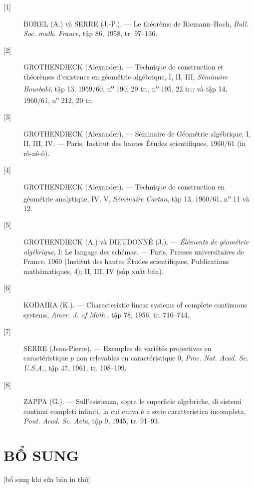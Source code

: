 \documentclass[11pt,twoside,openany]{book}
\numberwithin{equation}{section}
\begin{document}
\begin{description}
\item[{[1]}] BOREL (A.) và SERRE (J.-P.). --- Le théorème de Riemann--Roch,
\emph{Bull. Soc. math. France}, tập 86, 1958, tr. 97--136.

\item[{[2]}] GROTHENDIECK (Alexander). --- Technique de construction et
théorèmes d'existence en géométrie algébrique, I, II, III, \emph{Séminaire
Bourbaki}, tập 13, 1959/60, n\textsuperscript{o} 190, 29 tr.,
n\textsuperscript{o} 195, 22 tr.; và tập 14, 1960/61,
n\textsuperscript{o} 212, 20 tr.

\item[{[3]}] GROTHENDIECK (Alexander). --- Séminaire de Géométrie algébrique,
I, II, III, IV. --- Paris, Institut des hautes Études scientifiques, 1960/61
(in rô-nê-ô).

\item[{[4]}] GROTHENDIECK (Alexander). --- Technique de construction en
géométrie analytique, IV, V, \emph{Séminaire Cartan}, tập 13, 1960/61,
n\textsuperscript{o} 11 và 12.

\item[{[5]}] GROTHENDIECK (A.) và DIEUDONNÉ (J.). --- \emph{Éléments de
géométrie algébrique}, I: Le langage des schémas. --- Paris, Presses
universitaires de France, 1960 (Institut des hautes Études scientifiques,
Publications mathématiques, 4); II, III, IV (sắp xuất bản).

\item[{[6]}] KODAIRA (K.). --- Characteristic linear systems of complete
continuous systems, \emph{Amer. J. of Math.}, tập 78, 1956, tr. 716--744.

\item[{[7]}] SERRE (Jean-Pierre). --- Exemples de variétés projectives en
caractéristique $p$ non relevables en caractéristique 0, \emph{Proc. Nat. Acad.
Sc. U.S.A.}, tập 47, 1961, tr. 108--109.

\item[{[8]}] ZAPPA (G.). --- Sull'esistenza, sopra le superficie algebriche, di
sistemi continui completi infiniti, la cui curva è a serie caratteristica
incompleta, \emph{Pont. Acad. Sc. Acta}, tập 9, 1945, tr. 91--93.
\end{description}

\section*{BỔ SUNG}
\begin{center}
{\small [bổ sung khi sửa bản in thử]}
\end{center}
\end{document}
